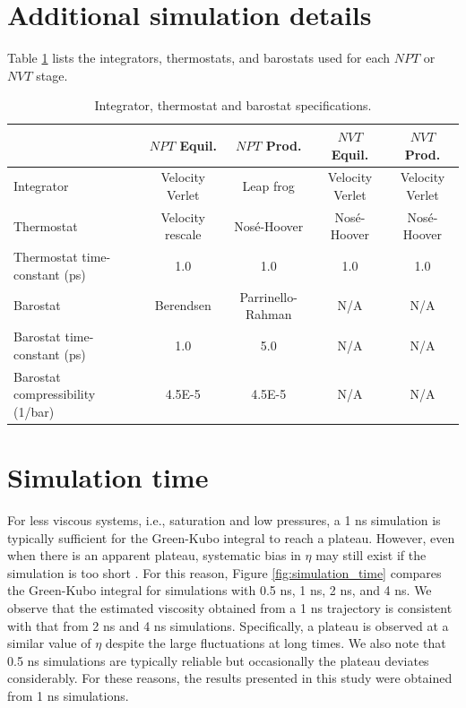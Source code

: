 \documentclass[preprint,review,11pt]{elsarticle}
\begin{document}
	\newpage

    \section{Additional simulation details} \label{Additional simulation details}
    
    Table \ref{tab:thermostats_barostats} lists the integrators, thermostats, and barostats used for each $NPT$ or $NVT$ stage.
    
    \begin{table}[htbp!]
    	\caption{Integrator, thermostat and barostat specifications.} \label{tab:thermostats_barostats}
    		\begin{tabular}{|p{2.6cm}|c|c|c|c|}
    			\hline
    			& $NPT$ Equil. & $NPT$ Prod. & $NVT$ Equil. & $NVT$ Prod. \\ \hline
    			Integrator & Velocity Verlet & Leap frog & Velocity Verlet & Velocity Verlet \\ \hline 
    			Thermostat & Velocity rescale & Nos{\'e}-Hoover & Nos{\'e}-Hoover & Nos{\'e}-Hoover \\ \hline 
    			Thermostat time-constant (ps) & 1.0 & 1.0 & 1.0 & 1.0 \\ \hline
    			Barostat & Berendsen & Parrinello-Rahman & N/A & N/A \\ \hline
    			Barostat time-constant (ps) & 1.0 & 5.0 & N/A & N/A \\ \hline
    			Barostat compressibility (1/bar) & 4.5E-5 & 4.5E-5 & N/A & N/A \\
    			\hline
    		\end{tabular}
    \end{table}
    
	\newpage
		
	\section{Simulation time} \label{SI:Simulation time}
	
	
	For less viscous systems, i.e., saturation and low pressures, a 1 ns simulation is typically sufficient for the Green-Kubo integral to reach a plateau. However, even when there is an apparent plateau, systematic bias in $\eta$ may still exist if the simulation is too short \cite{Maginn2018,Zhang2015}. For this reason, Figure \ref{fig:simulation_time} compares the Green-Kubo integral for simulations with 0.5 ns, 1 ns, 2 ns, and 4 ns. We observe that the estimated viscosity obtained from a 1 ns trajectory is consistent with that from 2 ns and 4 ns simulations. Specifically, a plateau is observed at a similar value of $\eta$ despite the large fluctuations at long times. We also note that 0.5 ns simulations are typically reliable but occasionally the plateau deviates considerably. For these reasons, the results presented in this study were obtained from 1 ns simulations.
	
\end{document}
